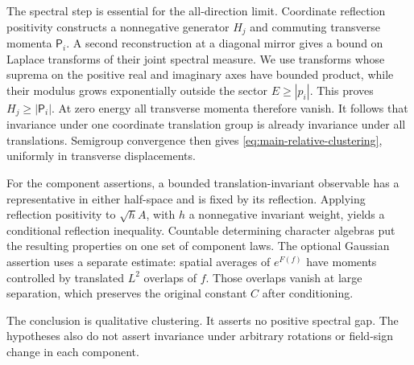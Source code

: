 The spectral step is essential for the all-direction limit.
Coordinate reflection positivity constructs a nonnegative generator
\(H_j\) and commuting transverse momenta \(\mathsf P_i\).
A second reconstruction at a diagonal mirror gives a bound on
Laplace transforms of their joint spectral measure. We use
transforms whose suprema on the positive real and imaginary axes
have bounded product, while their modulus grows exponentially
outside the sector \(E\ge|p_i|\).
This proves \(H_j\ge|\mathsf P_i|\).
At zero energy all transverse momenta therefore vanish.
It follows that invariance under one coordinate translation group
is already invariance under all translations. Semigroup convergence
then gives \eqref{eq:main-relative-clustering}, uniformly in
transverse displacements.

For the component assertions, a bounded translation-invariant
observable has a representative in either half-space and is fixed
by its reflection. Applying reflection positivity to \(\sqrt h A\),
with \(h\) a nonnegative invariant weight, yields a conditional
reflection inequality. Countable determining character algebras
put the resulting properties on one set of component laws.
The optional Gaussian assertion uses a separate estimate:
spatial averages of \(e^{F(f)}\) have moments controlled by
translated \(L^2\) overlaps of \(f\). Those overlaps vanish at
large separation, which preserves the original constant \(C\)
after conditioning.

The conclusion is qualitative clustering. It asserts no positive
spectral gap. The hypotheses also do not assert invariance under
arbitrary rotations or field-sign change in each component.

